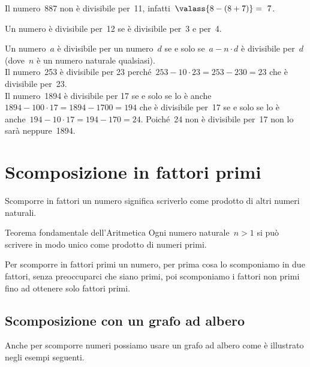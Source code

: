 \begin{description} [noitemsep]
Il numero~887 non è divisibile per~11, infatti~\(\valass{8-(8+7)}=~7\).
\item[12:~] Un numero è divisibile per~12 se è 
divisibile 
per~3 e per~4.
\item[un numero qualunque:~] Un numero~\(a\) è divisibile 
per un numero~\(d\) se e solo se~\(a - n \cdot d\) è divisibile per~\(d\) 
(dove~\(n\) è un numero naturale qualsiasi).\\
Il numero~253 è divisibile per 23 
perché~\(253 - 10 \cdot 23 = 253 - 230 = 23\) che è divisibile per~23.\\
Il numero~1894 è divisibile per 17 se e solo se lo è 
anche~\(1894 - 100 \cdot 17 = 1894 - 1700 = 194\) 
che è divisibile per~17 se e solo se lo è
anche~\(194 - 10 \cdot 17 = 194 - 170 = 24\). 
Poiché~24 non è divisibile per~17 non lo sarà neppure~1894.
\end{description}



\section{Scomposizione in fattori primi}
\label{sec:nat_scomposizione}

Scomporre in fattori un numero significa scriverlo come prodotto di altri 
numeri naturali. 


\begin{teorema}{Teorema fondamentale dell'Aritmetica}{}
 Ogni numero naturale~\(n>1\) si può scrivere in modo unico come prodotto di 
 numeri primi.
\end{teorema}

Per scomporre in fattori primi un numero, per prima cosa lo scomponiamo in 
due fattori, senza preoccuparci che siano primi, poi scomponiamo i fattori
non primi fino ad ottenere solo fattori primi.

\subsection{Scomposizione con un grafo ad albero}

Anche per scomporre numeri possiamo usare un grafo ad albero come è 
illustrato negli esempi seguenti.


